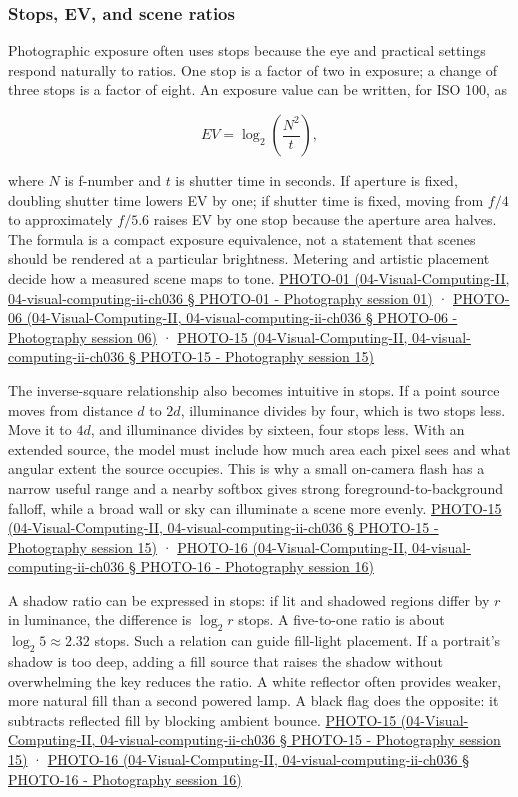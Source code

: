 \subsubsection{Stops, EV, and scene ratios}\label{stops-ev-and-scene-ratios}

Photographic exposure often uses stops because the eye and practical settings respond naturally to ratios. One stop is a factor of two in exposure; a change of three stops is a factor of eight. An exposure value can be written, for ISO 100, as

\[
EV=\log_2\left(\frac{N^2}{t}\right),
\]

where \(N\) is f-number and \(t\) is shutter time in seconds. If aperture is fixed, doubling shutter time lowers EV by one; if shutter time is fixed, moving from \(f/4\) to approximately \(f/5.6\) raises EV by one stop because the aperture area halves. The formula is a compact exposure equivalence, not a statement that scenes should be rendered at a particular brightness. Metering and artistic placement decide how a measured scene maps to tone. \href{}{PHOTO-01 (04-Visual-Computing-II, 04-visual-computing-ii-ch036 § PHOTO-01 - Photography session 01)} · \href{}{PHOTO-06 (04-Visual-Computing-II, 04-visual-computing-ii-ch036 § PHOTO-06 - Photography session 06)} · \href{}{PHOTO-15 (04-Visual-Computing-II, 04-visual-computing-ii-ch036 § PHOTO-15 - Photography session 15)}

The inverse-square relationship also becomes intuitive in stops. If a point source moves from distance \(d\) to \(2d\), illuminance divides by four, which is two stops less. Move it to \(4d\), and illuminance divides by sixteen, four stops less. With an extended source, the model must include how much area each pixel sees and what angular extent the source occupies. This is why a small on-camera flash has a narrow useful range and a nearby softbox gives strong foreground-to-background falloff, while a broad wall or sky can illuminate a scene more evenly. \href{}{PHOTO-15 (04-Visual-Computing-II, 04-visual-computing-ii-ch036 § PHOTO-15 - Photography session 15)} · \href{}{PHOTO-16 (04-Visual-Computing-II, 04-visual-computing-ii-ch036 § PHOTO-16 - Photography session 16)}

A shadow ratio can be expressed in stops: if lit and shadowed regions differ by \(r\) in luminance, the difference is \(\log_2 r\) stops. A five-to-one ratio is about \(\log_2 5\approx2.32\) stops. Such a relation can guide fill-light placement. If a portrait's shadow is too deep, adding a fill source that raises the shadow without overwhelming the key reduces the ratio. A white reflector often provides weaker, more natural fill than a second powered lamp. A black flag does the opposite: it subtracts reflected fill by blocking ambient bounce. \href{}{PHOTO-15 (04-Visual-Computing-II, 04-visual-computing-ii-ch036 § PHOTO-15 - Photography session 15)} · \href{}{PHOTO-16 (04-Visual-Computing-II, 04-visual-computing-ii-ch036 § PHOTO-16 - Photography session 16)}

